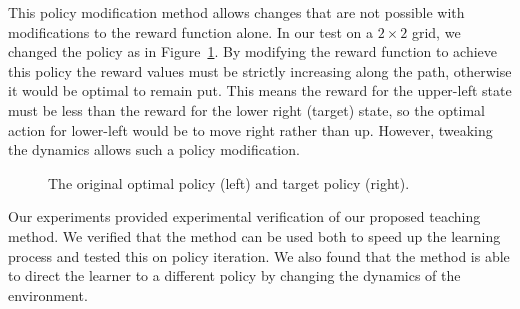 This policy modification method allows changes that are not possible with modifications to the reward function alone.  In our test on a $2 \times 2$ grid, we changed the policy as in Figure~\ref{envdopt}.  By modifying the reward function to achieve this policy the reward values must be strictly increasing along the path, otherwise it would be optimal to remain put.  This means the reward for the upper-left state must be less than the reward for the lower right (target) state, so the optimal action for lower-left would be to move right rather than up.  However, tweaking the dynamics allows such a policy modification.

\begin{figure}[ht]
\centerline{}
\caption{\label{envdopt}The original optimal policy (left) and target policy (right).}
\end{figure}

Our experiments provided experimental verification of our proposed teaching method.  We verified that the method can be used both to speed up the learning process and tested this on policy iteration.  We also found that the method is able to direct the learner to a different policy by changing the dynamics of the environment.
